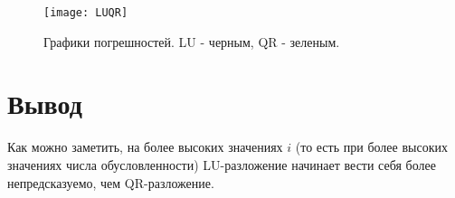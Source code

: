 \begin{figure}[H]
	\begin{center}
		\texttt{[image: LUQR]}
		\caption{Графики погрешностей. LU - черным, QR - зеленым.}
		\label{pic:luqr} %
	\end{center}
\end{figure}


\section{Вывод}
Как можно заметить, на более высоких значениях \(i\) (то есть при более высоких значениях числа обусловленности) LU-разложение начинает вести себя более непредсказуемо, чем QR-разложение.